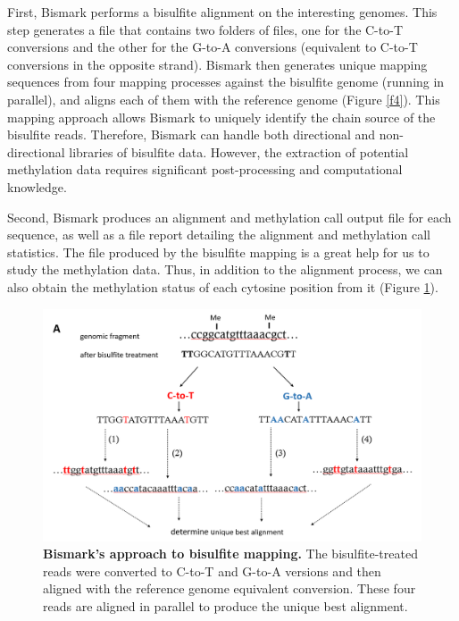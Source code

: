 \documentclass{PHlab-thesis}
\begin{document}
First, Bismark performs a bisulfite alignment on the interesting genomes. This step generates a file that contains two folders of files, one for the C-to-T conversions and the other for the G-to-A conversions (equivalent to C-to-T conversions in the opposite strand). Bismark then generates unique mapping sequences from four mapping processes against the bisulfite genome (running in parallel), and aligns each of them with the reference genome (Figure \ref{f4}). This mapping approach allows Bismark to uniquely identify the chain source of the bisulfite reads. Therefore, Bismark can handle both directional and non-directional libraries of bisulfite data. However, the extraction of potential methylation data requires significant post-processing and computational knowledge.

Second, Bismark produces an alignment and methylation call output file for each sequence, as well as a file report detailing the alignment and methylation call statistics. The file produced by the bisulfite mapping is a great help for us to study the methylation data. Thus, in addition to the alignment process, we can also obtain the methylation status of each cytosine position from it (Figure \ref{f3}).

\begin{figure}[h!]
  \centering
  \includegraphics[scale=0.8]{figures/bismark-a.png}
  \caption{\textbf{Bismark’s approach to bisulfite mapping.}
  The bisulfite-treated reads were converted to C-to-T and G-to-A versions and then aligned with the reference genome equivalent conversion. These four reads are aligned in parallel to produce the unique best alignment.}
  \label{f3}
\end{figure}
\end{document}
